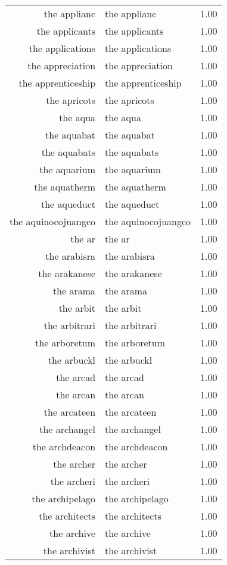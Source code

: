 \begin{table}[ht]
\begin{tabular}{rlr}
  the applianc & the applianc & 1.00 \\ 
  the applicants & the applicants & 1.00 \\ 
  the applications & the applications & 1.00 \\ 
  the appreciation & the appreciation & 1.00 \\ 
  the apprenticeship & the apprenticeship & 1.00 \\ 
  the apricots & the apricots & 1.00 \\ 
  the aqua & the aqua & 1.00 \\ 
  the aquabat & the aquabat & 1.00 \\ 
  the aquabats & the aquabats & 1.00 \\ 
  the aquarium & the aquarium & 1.00 \\ 
  the aquatherm & the aquatherm & 1.00 \\ 
  the aqueduct & the aqueduct & 1.00 \\ 
  the aquinocojuangco & the aquinocojuangco & 1.00 \\ 
  the ar & the ar & 1.00 \\ 
  the arabisra & the arabisra & 1.00 \\ 
  the arakanese & the arakanese & 1.00 \\ 
  the arama & the arama & 1.00 \\ 
  the arbit & the arbit & 1.00 \\ 
  the arbitrari & the arbitrari & 1.00 \\ 
  the arboretum & the arboretum & 1.00 \\ 
  the arbuckl & the arbuckl & 1.00 \\ 
  the arcad & the arcad & 1.00 \\ 
  the arcan & the arcan & 1.00 \\ 
  the arcateen & the arcateen & 1.00 \\ 
  the archangel & the archangel & 1.00 \\ 
  the archdeacon & the archdeacon & 1.00 \\ 
  the archer & the archer & 1.00 \\ 
  the archeri & the archeri & 1.00 \\ 
  the archipelago & the archipelago & 1.00 \\ 
  the architects & the architects & 1.00 \\ 
  the archive & the archive & 1.00 \\ 
  the archivist & the archivist & 1.00 \\ 

\end{tabular}
\end{table}

